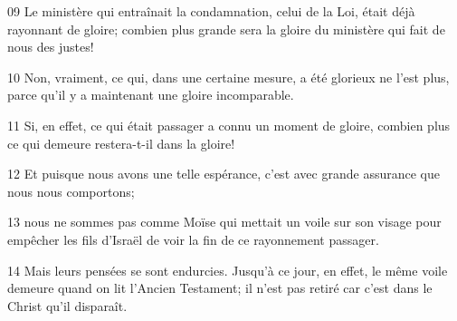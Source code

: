 
09 Le ministère qui entraînait la condamnation, celui de la Loi, était déjà rayonnant de gloire; combien plus grande sera la gloire du ministère qui fait de nous des justes!

10 Non, vraiment, ce qui, dans une certaine mesure, a été glorieux ne l’est plus, parce qu’il y a maintenant une gloire incomparable.

11 Si, en effet, ce qui était passager a connu un moment de gloire, combien plus ce qui demeure restera-t-il dans la gloire!

12 Et puisque nous avons une telle espérance, c’est avec grande assurance que nous nous comportons;

13 nous ne sommes pas comme Moïse qui mettait un voile sur son visage pour empêcher les fils d’Israël de voir la fin de ce rayonnement passager.

14 Mais leurs pensées se sont endurcies. Jusqu’à ce jour, en effet, le même voile demeure quand on lit l’Ancien Testament; il n’est pas retiré car c’est dans le Christ qu’il disparaît.